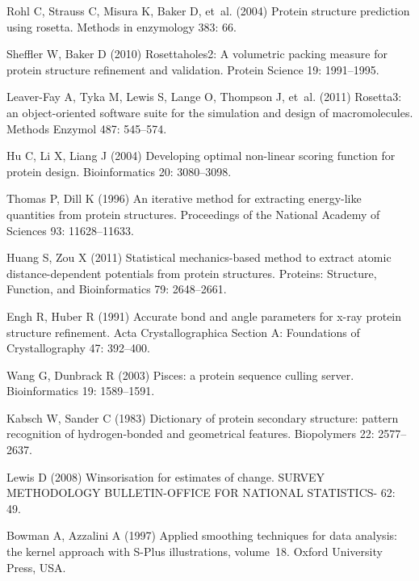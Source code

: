 \begin{thebibliography}{10}
Rohl C, Strauss C, Misura K, Baker D, et~al. (2004) Protein
structure
  prediction using rosetta.
\newblock Methods in enzymology 383: 66.

Sheffler W, Baker D (2010) Rosettaholes2: A volumetric packing
measure for
  protein structure refinement and validation.
\newblock Protein Science 19: 1991--1995.

Leaver-Fay A, Tyka M, Lewis S, Lange O, Thompson J, et~al. (2011)
Rosetta3: an
  object-oriented software suite for the simulation and design of
  macromolecules.
\newblock Methods Enzymol 487: 545--574.

Hu C, Li X, Liang J (2004) Developing optimal non-linear scoring
function for
  protein design.
\newblock Bioinformatics 20: 3080--3098.

Thomas P, Dill K (1996) An iterative method for extracting
energy-like
  quantities from protein structures.
\newblock Proceedings of the National Academy of Sciences 93: 11628--11633.

Huang S, Zou X (2011) Statistical mechanics-based method to extract
atomic
  distance-dependent potentials from protein structures.
\newblock Proteins: Structure, Function, and Bioinformatics 79: 2648--2661.

Engh R, Huber R (1991) Accurate bond and angle parameters for x-ray
protein
  structure refinement.
\newblock Acta Crystallographica Section A: Foundations of Crystallography 47:
  392--400.

Wang G, Dunbrack R (2003) Pisces: a protein sequence culling server.
\newblock Bioinformatics 19: 1589--1591.

Kabsch W, Sander C (1983) Dictionary of protein secondary structure:
pattern
  recognition of hydrogen-bonded and geometrical features.
\newblock Biopolymers 22: 2577--2637.

Lewis D (2008) Winsorisation for estimates of change.
\newblock SURVEY METHODOLOGY BULLETIN-OFFICE FOR NATIONAL STATISTICS- 62: 49.

Bowman A, Azzalini A (1997) Applied smoothing techniques for data
analysis: the
  kernel approach with S-Plus illustrations, volume~18.
\newblock Oxford University Press, USA.


\end{thebibliography}
